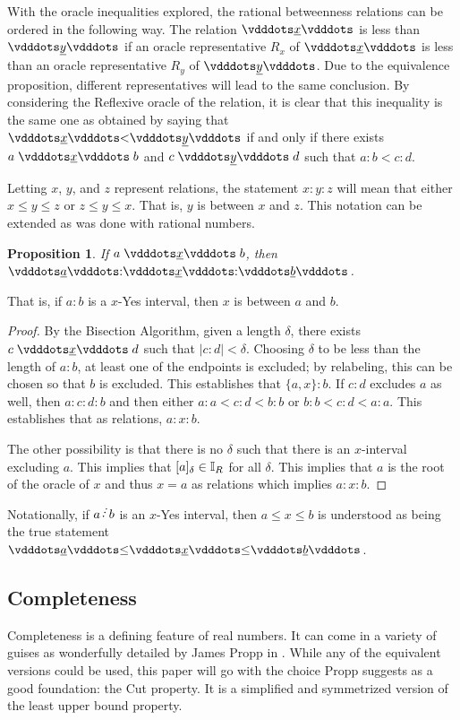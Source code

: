 \documentclass[12pt]{article}
\newtheorem{proposition}{Proposition}[section]
\begin{document}
With the oracle inequalities explored, the rational betweenness relations can be ordered in the following way. The relation $\xrel$ is less than $\xrel[y]$ if an oracle representative $R_x$ of $\xrel$ is less than an oracle representative $R_y$ of $\xrel[y]$. Due to the equivalence proposition, different representatives will lead to the same conclusion. By considering the Reflexive oracle of the relation, it is clear that this inequality is the same one as obtained by saying that $\xrel < \xrel[y]$ if and only if there exists $a \xrel b$ and $c \xrel[y] d$ such that $a:b < c:d$. 

Letting $x$, $y$, and $z$ represent relations, the statement $x:y:z$ will mean that either $x \leq y \leq z$ or $z \leq y \leq x$. That is, $y$ is between $x$ and $z$. This notation can be extended as was done with rational numbers. 

\begin{proposition}
    If $a \xrel b$, then $\xrel[a] : \xrel : \xrel[b]$.
\end{proposition}

That is, if $a:b$ is a $x$-Yes interval, then $x$ is between $a$ and $b$.

\begin{proof}
    By the Bisection Algorithm, given a length $\delta$, there exists $c \xrel d$ such that $|c:d|<\delta$. Choosing $\delta$ to be less than the length of $a:b$, at least one of the endpoints is excluded; by relabeling, this can be chosen so that $b$ is excluded. This establishes that $\{a, x\} : b$. If $c:d$ excludes $a$ as well, then $a : c:d:b$ and then either $a:a < c:d < b:b$ or $b:b < c:d < a:a$. This establishes that as relations, $a : x : b$. 

    The other possibility is that there is no $\delta$ such that there is an $x$-interval excluding $a$. This implies that $[a]_{\delta} \in \mathbb{I}_R$ for all $\delta$. This implies that $a$ is the root of the oracle of $x$ and thus $x = a$ as relations which implies $a:x:b$. 
\end{proof}

Notationally, if $a \lte b$ is an $x$-Yes interval, then $a \leq x \leq b$ is understood as being the true statement $\xrel[a] \leq \xrel \leq \xrel[b]$. 


\subsection{Completeness}

Completeness is a defining feature of real numbers. It can come in a variety of guises as wonderfully detailed by James Propp in \cite{propp}. While any of the equivalent versions could be used, this paper will go with the choice Propp suggests as a good foundation: the Cut property. It is a simplified and symmetrized version of the least upper bound property. 
\end{document}
